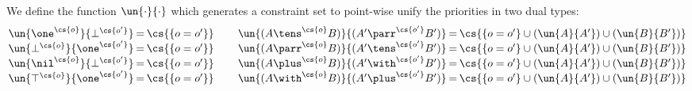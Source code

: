 \begin{definition}\label{def:cccp-un}
  We define the function $\un{\cdot}{\cdot}$ which generates a constraint set to
  point-wise unify the priorities in two dual types:
  \begin{gather*}
    \setlength{\arraycolsep}{1pt}
    \begin{array}{lclclcl}
      \un{\one^{\cs{o}}}{\bot^{\cs{o'}}}
      & = & \cs{\{ o = o' \}} & \qquad
      \un{( {A \tens^{\cs{o}} B} )}{( {A' \parr^{\cs{o'}} B'} )}
      & = & \cs{\{ o = o' \} \cup (\un{A}{A'}) \cup (\un{B}{B'}) } \\
      \un{\bot^{\cs{o}}}{\one^{\cs{o'}}}
      & = & \cs{\{ o = o' \}} & \qquad
      \un{( {A \parr^{\cs{o}} B} )}{( {A' \tens^{\cs{o'}} B'} )}
      & = & \cs{\{ o = o' \} \cup (\un{A}{A'}) \cup (\un{B}{B'}) } \\
      \un{\nil^{\cs{o}}}{\bot^{\cs{o'}}}
      & = & \cs{\{ o = o' \}} & \qquad
      \un{( {A \plus^{\cs{o}} B} )}{( {A' \with^{\cs{o'}} B'} )}
      & = & \cs{\{ o = o' \} \cup (\un{A}{A'}) \cup (\un{B}{B'}) } \\
      \un{\top^{\cs{o}}}{\one^{\cs{o'}}}
      & = & \cs{\{ o = o' \}} & \qquad
      \un{( {A \with^{\cs{o}} B} )}{( {A' \plus^{\cs{o'}} B'} )}
      & = & \cs{\{ o = o' \} \cup (\un{A}{A'}) \cup (\un{B}{B'}) } 
    \end{array}
  \end{gather*}
\end{definition}
